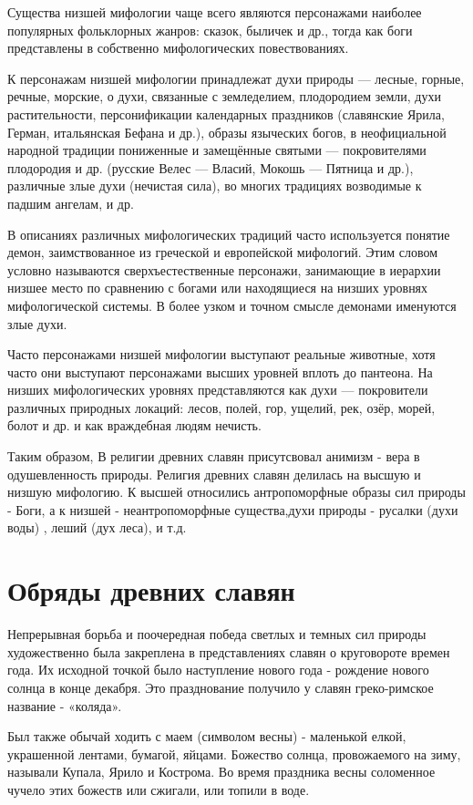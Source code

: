 \documentclass[a4paper, 12pt]{report}
\begin{document}
Существа низшей мифологии чаще всего являются персонажами наиболее популярных фольклорных жанров: сказок, быличек и др., тогда как боги представлены в собственно мифологических повествованиях.

К персонажам низшей мифологии принадлежат духи природы — лесные, горные, речные, морские, о духи, связанные с земледелием, плодородием земли, духи растительности, персонификации календарных праздников (славянские Ярила, Герман, итальянская Бефана и др.), образы языческих богов, в неофициальной народной традиции пониженные и замещённые святыми — покровителями плодородия и др. (русские Велес — Власий, Мокошь — Пятница и др.), различные злые духи (нечистая сила), во многих традициях возводимые к падшим ангелам, и др.

В описаниях различных мифологических традиций часто используется понятие демон, заимствованное из греческой и европейской мифологий. Этим словом условно называются сверхъестественные персонажи, занимающие в иерархии низшее место по сравнению с богами или находящиеся на низших уровнях мифологической системы. В более узком и точном смысле демонами именуются злые духи.

Часто персонажами низшей мифологии выступают реальные животные, хотя часто они выступают персонажами высших уровней вплоть до пантеона. На низших мифологических уровнях представляются как духи — покровители различных природных локаций: лесов, полей, гор, ущелий, рек, озёр, морей, болот и др. и как враждебная людям нечисть.

Таким образом, В религии древних славян присутсвовал анимизм - вера в одушевленность природы. Религия древних славян делилась на высшую и низшую мифологию. К высшей относились антропоморфные образы сил природы - Боги, а к низшей - неантропоморфные существа,духи природы - русалки (духи воды) , леший (дух леса), и т.д. 


\chapter{Обряды древних славян}


Непрерывная борьба и поочередная победа светлых и темных сил
природы художественно была закреплена в представлениях славян о
круговороте времен года. Их исходной точкой было наступление нового года
- рождение нового солнца в конце декабря. Это празднование получило у
славян греко-римское название - «коляда». 

Был также обычай ходить с маем
(символом весны) - маленькой елкой, украшенной лентами, бумагой,
яйцами. Божество солнца, провожаемого на зиму, называли Купала, Ярило и
Кострома. Во время праздника весны соломенное чучело этих божеств или
сжигали, или топили в воде.
\end{document}
